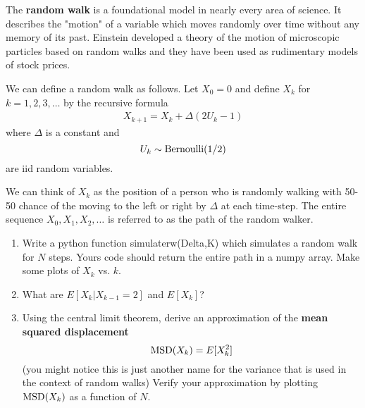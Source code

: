 \begin{exercise}
The {\bf random walk} is a foundational model in nearly every area of science.  It describes the "motion" of a variable which moves randomly over time without any memory of its past. Einstein developed a theory of the motion of microscopic particles based on random walks and they have been used as rudimentary models of stock prices. 

We can define a random walk as follows. 
Let $X_0=0$ and define $X_k$ for $k=1,2,3,\dots$ by the recursive formula 
\begin{align}\label{eq:rw}
X_{k+1} = X_{k}  + \Delta(2U_k - 1)
\end{align}
where $\Delta$ is a constant and 
\begin{equation*}
U_k  \sim {\rm Bernoulli}(1/2)
\end{equation*}
are iid random variables. 


We can think of $X_k$ as the position of a person who is randomly walking with 50-50 chance of the moving to the left or right by $\Delta$ at each time-step. The entire sequence $X_0,X_1,X_2,\dots$ is referred to as the path of the random walker. 
\begin{enumerate}[label=(\alph*)]
\item Write a python function simulaterw(Delta,K) which simulates a random walk for $N$ steps. Yours code should return the entire path in a numpy array. Make some plots of $X_k$ vs. $k$. 
\item What are $E[X_k|X_{k-1}=2]$ and $E[X_k]$? 
\item Using the central limit theorem, derive an approximation of the {\bf mean squared displacement}
\begin{equation*}
{\rm MSD}(X_k) = E[X_k^2]
\end{equation*}
(you might notice this is just another name for the variance that is used in the context of random walks)
Verify your approximation by plotting ${\rm MSD}(X_k)$ as a function of $N$. 
\end{enumerate}




\end{exercise}





 


  
  
 
 